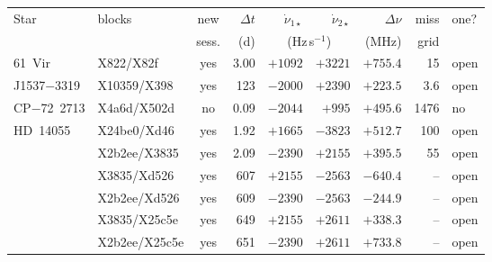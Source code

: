 \begin{tabular}{@{}l@{\,}l@{\,}c@{\,}r@{\,}r@{\,}r@{\,}r@{\,}r@{\,}l@{}}
\hline
Star & blocks & new & $\Delta t$ & $\dot\nu_{1\star}$ & $\dot\nu_{2\star}$ & $\Delta\nu$ & miss & one? \\
 & & sess. & (d) & \multicolumn{2}{c}{(Hz\,s$^{-1}$)} & (MHz) & grid & \\
\hline
61~Vir & X822/X82f & yes & 3.00 & $+1092$ & $+3221$ & $+755.4$ & 15 & open \\
J1537$-$3319 & X10359/X398 & yes & 123 & $-2000$ & $+2390$ & $+223.5$ & 3.6 & open \\
CP$-$72~2713 & X4a6d/X502d & no & 0.09 & $-2044$ & $+995$ & $+495.6$ & 1476 & no \\
HD~14055 & X24be0/Xd46 & yes & 1.92 & $+1665$ & $-3823$ & $+512.7$ & 100 & open \\
 & X2b2ee/X3835 & yes & 2.09 & $-2390$ & $+2155$ & $+395.5$ & 55 & open \\
 & X3835/Xd526 & yes & 607 & $+2155$ & $-2563$ & $-640.4$ & -- & open \\
 & X2b2ee/Xd526 & yes & 609 & $-2390$ & $-2563$ & $-244.9$ & -- & open \\
 & X3835/X25c5e & yes & 649 & $+2155$ & $+2611$ & $+338.3$ & -- & open \\
 & X2b2ee/X25c5e & yes & 651 & $-2390$ & $+2611$ & $+733.8$ & -- & open \\
\hline
\end{tabular}
